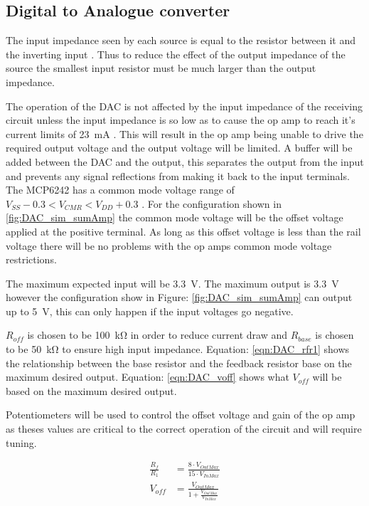\clearpage
\subsection{Digital to Analogue converter}
The input impedance seen by each source is equal to the resistor between it and the inverting input \cite{Lit_SumAmp_ET}. Thus to reduce the effect of the output impedance of the source the smallest input resistor must be much larger than the output impedance.

The operation of the DAC is not affected by the input impedance of the receiving circuit unless the input impedance is so low as to cause the op amp to reach it's current limits of \SI{23}{\milli\ampere} \cite{Data_MCP}. This will result in the op amp being unable to drive the required output voltage and the output voltage will be limited. A buffer will be added between the DAC and the output, this separates the output from the input and prevents any signal reflections from making it back to the input terminals.
\medskip\\
The MCP6242 has a common mode voltage range of $V_{SS} -0.3 < V_{CMR} < V_{DD} +0.3$ \cite{Data_MCP}. For the configuration shown in \ref{fig:DAC_sim_sumAmp} the common mode voltage will be the offset voltage applied at the positive terminal. As long as this offset voltage is less than the rail voltage there will be no problems with the op amps common mode voltage restrictions.

The maximum expected input will be \SI{3.3}{\volt}. The maximum output is \SI{3.3}{\volt} however the configuration show in Figure: \ref{fig:DAC_sim_sumAmp} can output up to \SI{5}{\volt}, this can only happen if the input voltages go negative.

$R_{off}$ is chosen to be \SI{100}{\kilo\ohm} in order to reduce current draw and $R_{base}$ is chosen to be \SI{50}{\kilo\ohm} to ensure high input impedance. Equation: \ref{eqn:DAC_rfr1} shows the relationship between the base resistor and the feedback resistor base on the maximum desired output. Equation: \ref{eqn:DAC_voff} shows what $V_{off}$ will be based on the maximum desired output. 

Potentiometers will be used to control the offset voltage and gain of the op amp as theses values are critical to the correct operation of the circuit and will require tuning.

\begin{align}
\frac{R_f}{R_1} &= \frac{8 \cdot V_{OutMax}}{15 \cdot V_{InMax}}\label{eqn:DAC_rfr1}\\
V_{off} &= \frac{V_{OutMax}}{1+\frac{V_{OutMax}}{V_{InMax}}}\label{eqn:DAC_voff}
\end{align}

